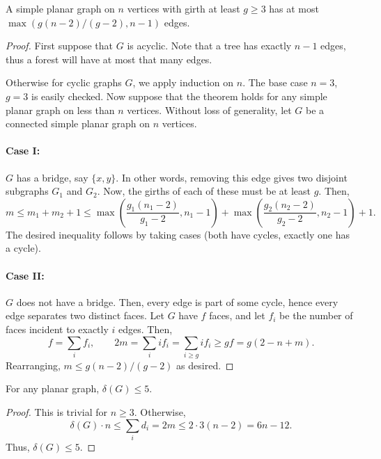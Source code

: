 \documentclass[11pt]{article}
\theoremstyle{definition}
\theoremstyle{remark}
\numberwithin{equation}{section}
\begin{document}
    \begin{theorem}
        A simple planar graph on $n$ vertices with girth at least $g \geq 3$ has at
        most $\max(g(n - 2)/(g - 2), n - 1)$ edges.
    \end{theorem}
    \begin{proof}
        First suppose that $G$ is acyclic. Note that a tree has exactly $n - 1$
        edges, thus a forest will have at most that many edges.

        Otherwise for cyclic graphs $G$, we apply induction on $n$. The base case $n
        = 3$, $g = 3$ is easily checked. Now suppose that the theorem holds for any
        simple planar graph on less than $n$ vertices. Without loss of generality,
        let $G$ be a connected simple planar graph on $n$ vertices.

        \paragraph{Case I:} $G$ has a bridge, say $\{x, y\}$. In other words,
        removing this edge gives two disjoint subgraphs $G_1$ and $G_2$. Now, the
        girths of each of these must be at least $g$. Then, \[
            m \leq m_1 + m_2 + 1 \leq \max\left(\frac{g_1(n_1 - 2)}{g_1 - 2}, n_1 -
            1\right) + \max\left(\frac{g_2(n_2 - 2)}{g_2 - 2}, n_2 - 1\right) + 1.
        \] The desired inequality follows by taking cases (both have cycles, exactly
        one has a cycle).

        \paragraph{Case II:} $G$ does not have a bridge. Then, every edge is part of
        some cycle, hence every edge separates two distinct faces. Let $G$ have $f$
        faces, and let $f_i$ be the number of faces incident to exactly $i$ edges.
        Then, \[
            f = \sum_i f_i, \qquad 2m = \sum_i if_i = \sum_{i \geq g} if_i \geq gf =
            g(2 - n + m).
        \] Rearranging, $m \leq g(n - 2) / (g - 2)$ as desired.
    \end{proof}

    \begin{corollary}
        For any planar graph, $\delta(G) \leq 5$.
    \end{corollary}
    \begin{proof}
        This is trivial for $n \geq 3$. Otherwise, \[
            \delta(G)\cdot n \leq \sum_i d_i = 2m \leq 2\cdot 3(n - 2) = 6n - 12.
        \] Thus, $\delta(G) \leq 5$.
    \end{proof}
\end{document}
